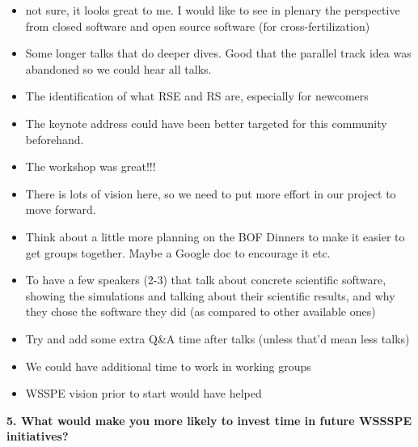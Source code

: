 \begin{itemize}
\item not sure, it looks great to me. I would like to see in plenary the perspective from closed software and open source software (for cross-fertilization)
\item Some longer talks that do deeper dives.  Good that the parallel track idea was abandoned so we could hear all talks.
\item The identification of what RSE and RS are, especially for newcomers
\item The keynote address could have been better targeted for this community beforehand.
\item The workshop was great!!!
\item There is lots of vision here, so we need to put more effort in our project to move forward.
\item Think about a little more planning on the BOF Dinners to make it easier to get groups together. Maybe a Google doc to encourage it etc.
\item To have a few speakers (2-3) that talk about concrete scientific software, showing the simulations and talking about their scientific results, and why they chose the software they did (as compared to other available ones)
\item Try and add some extra Q\&A time after talks (unless that'd mean less talks)
\item We could have additional time to work in working groups
\item WSSPE vision prior to start would have helped
\end{itemize}

\noindent \textbf{5. What would make you more likely to invest time in future WSSSPE initiatives?}

